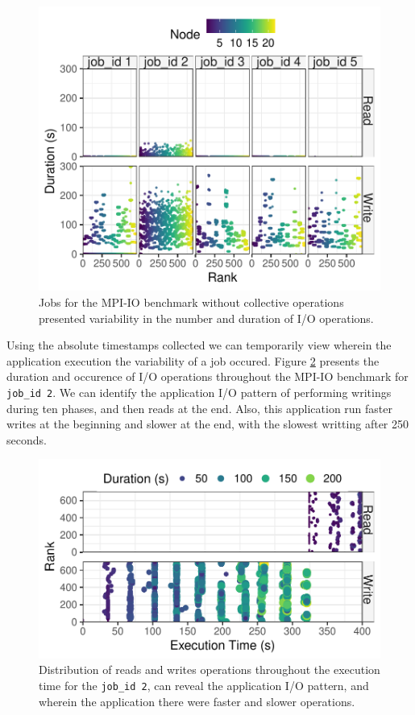\begin{figure}
	\centering
        \includegraphics[width=\linewidth]{figs/mpi_io_luster_no_coll_duration_allexperiments.pdf}
	\caption{Jobs for the MPI-IO benchmark without collective
          operations presented variability in the number and duration
          of I/O operations.}
	\label{f:mpi_io_all}
\end{figure}

Using the absolute timestamps collected we can temporarily view
wherein the application execution the variability of a job
occured. Figure \ref{f:mpi_io} presents the duration and occurence of
I/O operations throughout the MPI-IO benchmark for \texttt{job\_id
  2}. We can identify the application I/O pattern of performing
writings during ten phases, and then reads at the end. Also, this
application run faster writes at the beginning and slower at the end,
with the slowest writting after 250 seconds.
      
\begin{figure}
	\centering
	\includegraphics[width=\linewidth]{figs/255653_mpi_io_luster_no_coll_execution2.pdf}
	\caption{Distribution of reads and writes operations
          throughout the execution time for the \texttt{job\_id 2},
          can reveal the application I/O pattern, and wherein the
          application there were faster and slower operations.}
	\label{f:mpi_io}
\end{figure}

